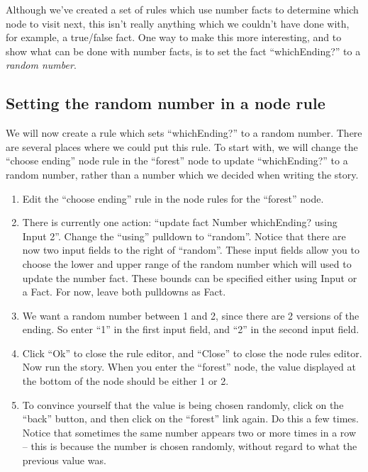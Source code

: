 \documentclass{article}
\begin{document}
Although we've created a set of rules which use number facts to 
determine which node to visit next, this isn't really anything which 
we couldn't have done with, for example, a true\slash false fact. One way 
to make this more interesting, and to show what can be done with 
number facts, is to set the fact ``whichEnding?'' to a \textit{random 
number}. 

\subsection{Setting the random number in a node rule}

We will now create a rule which sets ``whichEnding?'' to a random 
number. There are several places where we could put this rule. To 
start with, we will change the ``choose ending'' node rule in the 
``forest'' node to update ``whichEnding?'' to a random number, rather 
than a number which we decided when writing the story.

\begin{enumerate}
    \item Edit the ``choose ending'' rule in the node rules for the 
    ``forest'' node.
    \item There is currently one action: ``update fact Number 
    whichEnding? using Input 2''. Change the ``using'' pulldown to 
    ``random''. Notice that there are now two input fields to the 
    right of ``random''. These input fields allow you 
    to choose the lower and upper range of the random number which 
    will used to update the number fact. These bounds can be 
    specified either using Input or a Fact. For now, leave both 
    pulldowns as Fact.
    \item We want a random number between 1 and 2, since there are 2 
    versions of the ending. So enter ``1'' in the first input field, 
    and ``2'' in the second input field. 
    \item Click ``Ok'' to close the rule editor, and ``Close'' to 
    close the node rules editor. Now run the story. When you enter 
    the ``forest'' node, the value displayed at the bottom of the 
    node should be either 1 or 2.
    \item To convince yourself that the value is being chosen 
    randomly, click on the ``back'' button, and then click on the 
    ``forest'' link again. Do this a few times. Notice that sometimes 
    the same number appears two or more times in a row -- this is 
    because the number is chosen randomly, without regard to what the 
    previous value was. 
\end{enumerate}
\end{document}
